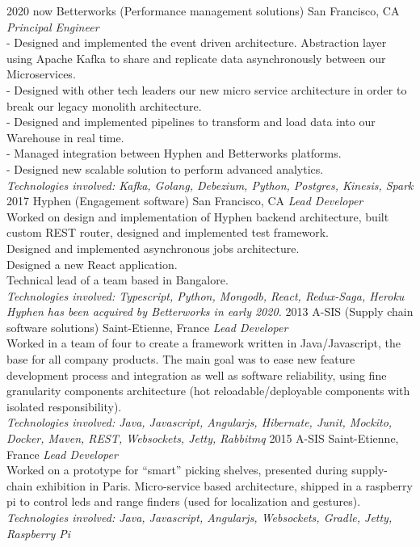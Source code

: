 \documentclass[]{k-cv} %
\begin{document}
\begin{entrylist}
\entry
{2020 \to now}
{Betterworks (Performance management solutions)}
{San Francisco, CA}
{\emph{Principal Engineer} \\
- Designed and implemented the event driven architecture. Abstraction layer using Apache Kafka to share and replicate data asynchronously between our Microservices.\\
- Designed with other tech leaders our new micro service architecture in order to break our legacy monolith architecture.\\
- Designed and implemented pipelines to transform and load data into our Warehouse in real time.\\
- Managed integration between Hyphen and Betterworks platforms.\\
- Designed new scalable solution to perform advanced analytics.\\
\emph{
Technologies involved:
Kafka, Golang, Debezium, Python, Postgres, Kinesis, Spark
}}
\entry
{2017 }
{Hyphen (Engagement software)}
{San Francisco, CA}
{\emph{Lead Developer} \\
Worked on design and implementation of Hyphen backend architecture, built custom REST router, designed and implemented test framework.\\
Designed and implemented asynchronous jobs architecture.\\
Designed a new React application.\\
Technical lead of a team based in Bangalore.\\
\emph{
Technologies involved:
Typescript, Python, Mongodb, React, Redux-Saga, Heroku
\\ Hyphen has been acquired by Betterworks in early 2020.
}}
\entry
{2013 }
{A-SIS (Supply chain software solutions)}
{Saint-Etienne, France}
{\emph{Lead Developer} \\
Worked in a team of four to create a framework written in Java/Javascript,
 the base for all company products.
The main goal was to ease new feature development process and integration as well as software reliability,
  using fine granularity components architecture (hot reloadable/deployable components with isolated responsibility). \\
\emph{
Technologies involved:
Java, Javascript, Angularjs, Hibernate, Junit, Mockito, Docker, 
Maven, REST, Websockets, Jetty, Rabbitmq
}}
\entry
{2015}
{A-SIS}
{Saint-Etienne, France}
{\emph{Lead Developer} \\
Worked on a prototype for ``smart'' picking shelves, presented during supply-chain exhibition in Paris.
Micro-service based architecture, shipped in a raspberry pi to control leds and range finders
(used for localization and gestures). \\
\emph{
Technologies involved:
Java, Javascript, Angularjs, Websockets, Gradle, Jetty, Raspberry Pi
}}
\end{entrylist}
\end{document}
